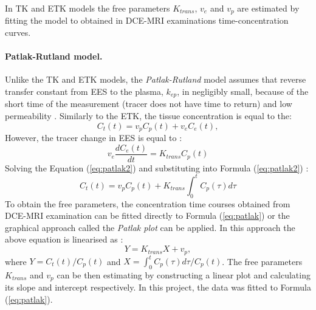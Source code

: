 In TK and ETK models the free parameters $K_{trans}$, $v_e$ and $v_p$ are estimated by fitting the model to obtained in DCE-MRI examinations time-concentration curves.  
\paragraph{Patlak-Rutland model.}
Unlike the TK and ETK models, the \textit{Patlak-Rutland} model \cite{patlak1983graphical} assumes that reverse transfer constant from EES to the plasma, $k_{ep}$, in negligibly small, because of the short time of the measurement (tracer does not have time to return) and low permeability \cite{khalifa2014models}. 
Similarly to the ETK, the tissue concentration is equal to the:
\begin{equation}
C_t(t) = v_pC_p(t) + v_eC_e(t),
\label{eq:patlak1}
\end{equation}
However, the tracer change in EES is equal to \cite{thesis,patlak1983graphical}: 
\begin{equation}
	\label{eq:patlak2}
	v_e\frac{dC_{e}(t)}{dt} = K_{trans}C_p(t)
\end{equation}
Solving the Equation (\ref{eq:patlak2}) and substituting into Formula (\ref{eq:patlak2}) \cite{khalifa2014models, patlak1983graphical}: 
\begin{equation}
	\label{eq:patlak}
	C_{t}(t) =v_pC_p(t) + K_{trans}\int_{0}^{t}C_p(\tau)d\tau  
\end{equation}
To obtain the free parameters, the concentration time courses obtained from DCE-MRI examination can be fitted directly to Formula (\ref{eq:patlak}) or the graphical approach called the \textit{Patlak plot} can be applied. In this approach the above equation is linearised as \cite{khalifa2014models, patlak1983graphical}:  
\begin{equation}
	\label{eq:patlak_lin}
	Y = K_{trans}X +v_p,  
\end{equation}
where $Y=C_t(t)/C_p(t)$ and $X=\int_{0}^{t}C_p(\tau)d\tau/C_p(t)$. The free parameters $K_{trans}$ and $v_p$ can be then estimating by constructing a linear plot and calculating its slope and intercept respectively.
In this project, the data was fitted to Formula (\ref{eq:patlak}). 
\newpage

